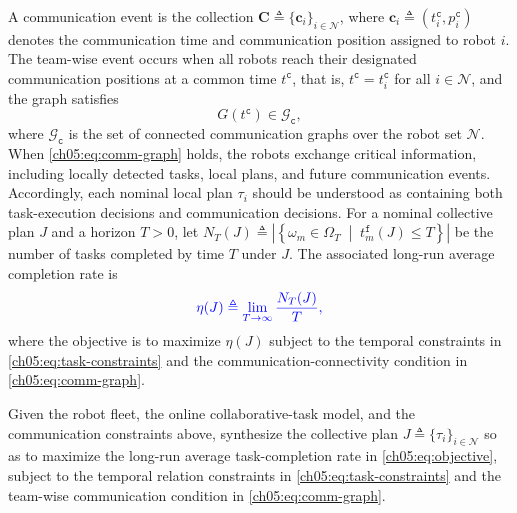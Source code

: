 A communication event is the collection
$\mathbf{C} \triangleq \{\mathbf{c}_i\}_{i \in \mathcal{N}}$,
where $\mathbf{c}_i \triangleq (t_i^{\texttt{c}}, p_i^{\texttt{c}})$ denotes
the communication time and communication position assigned to robot $i$. The
team-wise event occurs when all robots reach their designated communication
positions at a common time $t^{\texttt{c}}$, that is,
$t^{\texttt{c}} = t_i^{\texttt{c}}$ for all $i \in \mathcal{N}$, and the graph
satisfies
\begin{equation}
G(t^{\texttt{c}}) \in \mathcal{G}_{\texttt{c}},
\label{ch05:eq:comm-graph}
\end{equation}
where $\mathcal{G}_{\texttt{c}}$ is the set of connected communication graphs
over the robot set $\mathcal{N}$.
When \eqref{ch05:eq:comm-graph} holds, the robots exchange critical information,
including locally detected tasks, local plans, and future communication events.
Accordingly, each nominal local plan $\tau_i$ should be understood as containing both
task-execution decisions and communication decisions.
For a nominal collective plan $J$ and a horizon $T > 0$, let
$N_T(J) \triangleq
\left|\left\{\omega_m \in \Omega_T\;\middle|\;t_m^{\texttt{f}}(J) \leq T\right\}
\right|$
be the number of tasks completed by time $T$ under $J$. The associated long-run
average completion rate is
\begin{equation}
\color{blue}\label{ch05:eq:objective}
  \eta(J) \triangleq \lim_{T \to \infty} \frac{N_T(J)}{T},
\end{equation}
where the objective is to maximize $\eta(J)$ subject to the temporal constraints in
\eqref{ch05:eq:task-constraints} and the communication-connectivity condition
in \eqref{ch05:eq:comm-graph}.


\begin{problem}
\label{ch05:prob:collective-plan}
Given the robot fleet, the online collaborative-task model,
and the communication constraints above, synthesize the collective plan
$J \triangleq \{\tau_i\}_{i \in \mathcal{N}}$ so as to maximize the long-run
average task-completion rate in \eqref{ch05:eq:objective}, subject to the
temporal relation constraints in \eqref{ch05:eq:task-constraints} and the
team-wise communication condition in \eqref{ch05:eq:comm-graph}.
\end{problem}





















